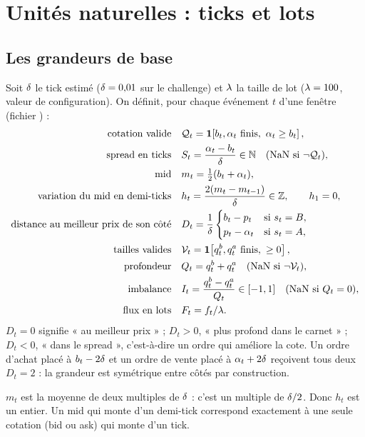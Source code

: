 \section{Unités naturelles : ticks et lots}\label{sec:unites}

\subsection{Les grandeurs de base}
Soit $\delta$ le tick estimé ($\delta=0{,}01$ sur le challenge) et $\lambda$ la taille de lot ($\lambda=100$, valeur de configuration). On définit, pour chaque événement $t$ d'une fenêtre (fichier ) :
\begin{align}
\text{cotation valide}\quad & \mathcal{Q}_t=\ind{b_t,\alpha_t\ \text{finis},\ \alpha_t\ge b_t},\\
\text{spread en ticks}\quad & S_t=\frac{\alpha_t-b_t}{\tick}\in\N\quad(\text{NaN si }\neg\mathcal{Q}_t),\\
\text{mid}\quad & m_t=\tfrac12(b_t+\alpha_t),\\
\text{variation du mid en demi-ticks}\quad & h_t=\frac{2(m_t-m_{t-1})}{\tick}\in\Z,\qquad h_1=0,\\
\text{distance au meilleur prix de son côté}\quad & D_t=\frac1\tick\begin{cases}b_t-p_t&\text{si }s_t=B,\\ p_t-\alpha_t&\text{si }s_t=A,\end{cases}\\
\text{tailles valides}\quad & \mathcal{V}_t=\ind{q^b_t,q^a_t\ \text{finis},\ \ge0},\\
\text{profondeur}\quad & Q_t=q^b_t+q^a_t\quad(\text{NaN si }\neg\mathcal{V}_t),\\
\text{imbalance}\quad & I_t=\frac{q^b_t-q^a_t}{Q_t}\in[-1,1]\quad(\text{NaN si }Q_t=0),\\
\text{flux en lots}\quad & F_t=f_t/\lot .
\end{align}
$D_t=0$ signifie « au meilleur prix » ; $D_t>0$, « plus profond dans le carnet » ; $D_t<0$, « dans le spread », c'est-à-dire un ordre qui améliore la cote. Un ordre d'achat placé à $b_t-2\delta$ et un ordre de vente placé à $\alpha_t+2\delta$ reçoivent tous deux $D_t=2$ : la grandeur est symétrique entre côtés par construction.

\begin{remarque}
$m_t$ est la moyenne de deux multiples de $\delta$ : c'est un multiple de $\delta/2$. Donc $h_t$ est un entier. Un mid qui monte d'un demi-tick correspond exactement à une seule cotation (bid ou ask) qui monte d'un tick.
\end{remarque}

